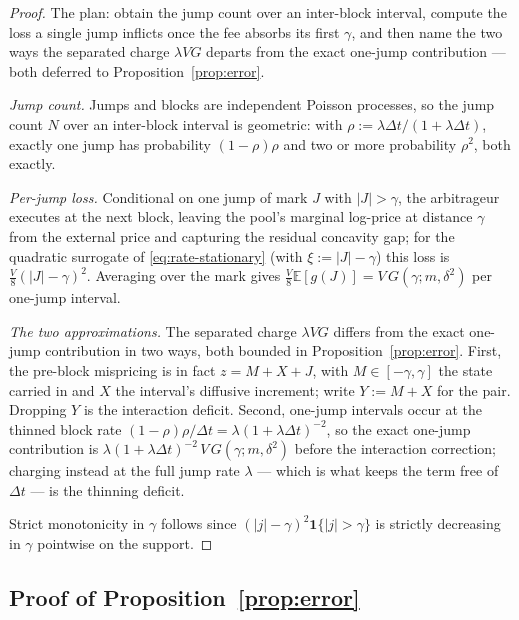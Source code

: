 \documentclass[runningheads]{llncs}
\newcommand{\E}{\mathbb{E}}
\newcommand{\dt}{\Delta t}
\newcommand{\1}{\mathbf{1}}
\begin{document}
\begin{proof}
The plan: obtain the jump count over an inter-block interval, compute the loss a single jump inflicts once the fee absorbs its first $\gamma$, and then name the two ways the separated charge $\lambda VG$ departs from the exact one-jump contribution --- both deferred to Proposition~\ref{prop:error}.

\emph{Jump count.} Jumps and blocks are independent Poisson processes, so the jump count $N$ over an inter-block interval is geometric: with $\rho:=\lambda\dt/(1+\lambda\dt)$, exactly one jump has probability $(1-\rho)\rho$ and two or more probability $\rho^2$, both exactly. 

\emph{Per-jump loss.} Conditional on one jump of mark $J$ with $|J|>\gamma$, the arbitrageur executes at the next block, leaving the pool's marginal log-price at distance $\gamma$ from the external price and capturing the residual concavity gap; for the quadratic surrogate of \eqref{eq:rate-stationary} (with $\xi := |J|-\gamma$) this loss is $\tfrac{V}{8}(|J|-\gamma)^2$. Averaging over the mark gives $\tfrac{V}{8}\E[g(J)] = V\,G(\gamma;m,\delta^2)$ per one-jump interval.

\emph{The two approximations.} The separated charge $\lambda V G$ differs from the exact one-jump contribution in two ways, both bounded in Proposition~\ref{prop:error}. First, the pre-block mispricing is in fact $z = M + X + J$, with $M\in[-\gamma,\gamma]$ the state carried in and $X$ the interval's diffusive increment; write $Y := M+X$ for the pair. Dropping $Y$ is the interaction deficit. Second, one-jump intervals occur at the thinned block rate $(1-\rho)\rho/\dt = \lambda(1+\lambda\dt)^{-2}$, so the exact one-jump contribution is $\lambda(1+\lambda\dt)^{-2}\,V\,G(\gamma;m,\delta^2)$ before the interaction correction; charging instead at the full jump rate $\lambda$ --- which is what keeps the term free of $\dt$ --- is the thinning deficit.

Strict monotonicity in $\gamma$ follows since $(|j|-\gamma)^2 \1\{|j|>\gamma\}$ is strictly decreasing in $\gamma$ pointwise on the support.
\end{proof}

\subsection{Proof of Proposition~\ref{prop:error}}\label{app:error}
\end{document}

